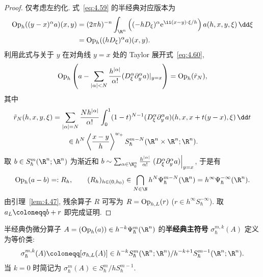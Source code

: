 \begin{proof}
仅考虑左约化. 式~\eqref{eq:4.59} 的半经典对应版本为
\begin{equation}\label{eq:4.141}
    \begin{aligned}
        \Op_h((y - x)^\alpha a)(x, y)
        &= (2\pi h)^{-n} \int_{\R^n} \left( (-h D_\xi)^\alpha \ee^{\ii (x-y) \cdot \xi / h} \right) a(h, x, y, \xi) \,\dd\xi \\
        &= \Op_h((h D_\xi)^\alpha a)(x, y).
    \end{aligned}
\end{equation}
利用此式与关于 $y$ 在对角线 $y = x$ 处的 Taylor 展开式~\eqref{eq:4.60},
\begin{equation}\label{eq:4.142}
    \operatorname{Op}_h\left( a - \sum_{|\alpha| < N} \frac{h^{|\alpha|}}{\alpha!} (D_\xi^\alpha \partial_y^\alpha a)|_{y=x} \right) = \operatorname{Op}_h(\tilde{r}_N),
\end{equation}
其中
\begin{equation}\label{eq:4.143}
    \begin{aligned}
        \tilde{r}_N(h, x, y, \xi) &= \sum_{|\alpha| = N} \frac{N h^{|\alpha|}}{\alpha!} \int_0^1 (1 - t)^{N-1} (D_\xi^\alpha \partial_y^\alpha a)(h, x, x + t(y - x), \xi) \,\dd t \\
        &\qquad \in h^N \left\langle \frac{x-y}{h} \right\rangle^{w_+} S_\hbar^{m-N}(\R^n \times \R^n; \R^n).
    \end{aligned}
\end{equation}
取 $b \in S_\hbar^m(\R^n; \R^n)$ 为渐近和 $b \sim \sum_{\alpha \in \N_0^n} \frac{h^{|\alpha|}}{\alpha!} \left. (D_\xi^\alpha \partial_y^\alpha a) \right|_{y=x}$, 于是有
\begin{equation}\label{eq:4.144}
    \Op_h(a - b) =: R_h, \qquad (R_h)_{h \in (0, h_0)} \in \bigcap_{N \in \N} h^N \Psi_\hbar^{m-N}(\R^n) = h^\infty \Psi_\hbar^{-\infty}(\R^n).
\end{equation}
由引理~\ref{lem:4.47}, 残余算子 $R$ 可写为 $R = \operatorname{Op}_{h, L}(r)$ ($r \in h^\infty S_\hbar^{-\infty}$). 取 $a_L \defeq b + r$ 即完成证明.
\end{proof}

\begin{definition}[半经典主符号]\label{def:4.49}
半经典伪微分算子 $A = (\Op_h(a)) \in h^{-k} \Psi_\hbar^m(\R^n)$ 的\textbf{半经典主符号} $\sigma_{\hbar}^{m, k}(A)$ 定义为等价类:
\begin{equation}\label{eq:4.145}
    \sigma_{\hbar}^{m, k}(A) \defeq [\sigma_{\hbar, L}(A)] \in h^{-k} S_\hbar^m(\R^n; \R^n) / h^{-k+1} S_\hbar^{m-1}(\R^n; \R^n).
\end{equation}
当 $k = 0$ 时简记为 $\sigma_\hbar^m(A) \in S_\hbar^m / h S_\hbar^{m-1}$.
\end{definition}


